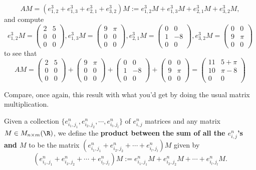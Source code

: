 \[AM=(e^3_{1,2}+e^3_{1,3}+e^3_{2,1}+e^3_{3,2})M:=e^3_{1,2}M+e^3_{1,3}M+e^3_{2,1}M+e^3_{3,2}M,\]and compute
\[e^3_{1,2}M=\begin{pmatrix}
2 & 5\\
0 & 0\\
0 & 0
\end{pmatrix},e^3_{1,3}M=\begin{pmatrix}
9 & \pi\\
0 & 0\\
0 & 0
\end{pmatrix},e^3_{2,1}M=\begin{pmatrix}
0 & 0\\
1 & -8\\
0 & 0
\end{pmatrix},e^3_{3,2}M=\begin{pmatrix}
0 & 0\\
9 & \pi\\
0 & 0
\end{pmatrix}\]to see that
\[AM=\begin{pmatrix}
2 & 5\\
0 & 0\\
0 & 0
\end{pmatrix}+\begin{pmatrix}
9 & \pi\\
0 & 0\\
0 & 0
\end{pmatrix}+\begin{pmatrix}
0 & 0\\
1 & -8\\
0 & 0
\end{pmatrix}+\begin{pmatrix}
0 & 0\\
9 & \pi\\
0 & 0
\end{pmatrix}=\begin{pmatrix}
11 & 5+\pi\\
10 & \pi-8\\
0 & 0
\end{pmatrix}\]

\begin{exerc}
	Compare, once again, this result with what you'd get by doing the usual matrix multiplication.
\end{exerc}

\begin{df}
	Given a collection $\{e^n_{i_1,j_1},e^n_{i_2,j_2},\cdots,e^n_{i_l,j_l}\}$ of $e_{i,j}^n$ matrices and any matrix $M\in M_{n\times m}(\R)$, we define the \textbf{product between the sum of all the $e_{i,j}^n$'s and $M$} to be the matrix $(e^n_{i_1,j_1}+e^n_{i_2,j_2}+\cdots+e^n_{i_l,j_l})M$ given by
	\[(e^n_{i_1,j_1}+e^n_{i_2,j_2}+\cdots+e^n_{i_l,j_l})M:=e^n_{i_1,j_1}M+e^n_{i_2,j_2}M+\cdots+e^n_{i_l,j_l}M.\]
\end{df}

